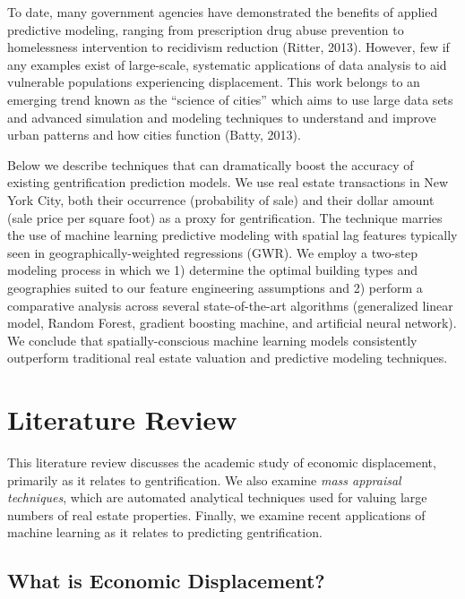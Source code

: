 \documentclass[conference,final,]{IEEEtran}
\begin{document}
To date, many government agencies have demonstrated the benefits of
applied predictive modeling, ranging from prescription drug abuse
prevention to homelessness intervention to recidivism reduction (Ritter,
2013). However, few if any examples exist of large-scale, systematic
applications of data analysis to aid vulnerable populations experiencing
displacement. This work belongs to an emerging trend known as the
``science of cities'' which aims to use large data sets and advanced
simulation and modeling techniques to understand and improve urban
patterns and how cities function (Batty, 2013).

Below we describe techniques that can dramatically boost the accuracy of
existing gentrification prediction models. We use real estate
transactions in New York City, both their occurrence (probability of
sale) and their dollar amount (sale price per square foot) as a proxy
for gentrification. The technique marries the use of machine learning
predictive modeling with spatial lag features typically seen in
geographically-weighted regressions (GWR). We employ a two-step modeling
process in which we 1) determine the optimal building types and
geographies suited to our feature engineering assumptions and 2) perform
a comparative analysis across several state-of-the-art algorithms
(generalized linear model, Random Forest, gradient boosting machine, and
artificial neural network). We conclude that spatially-conscious machine
learning models consistently outperform traditional real estate
valuation and predictive modeling techniques.

\hypertarget{literature-review}{%
\section{Literature Review}\label{literature-review}}

This literature review discusses the academic study of economic
displacement, primarily as it relates to gentrification. We also examine
\emph{mass appraisal techniques}, which are automated analytical
techniques used for valuing large numbers of real estate properties.
Finally, we examine recent applications of machine learning as it
relates to predicting gentrification.

\hypertarget{what-is-economic-displacement}{%
\subsection{What is Economic
Displacement?}\label{what-is-economic-displacement}}
\end{document}
